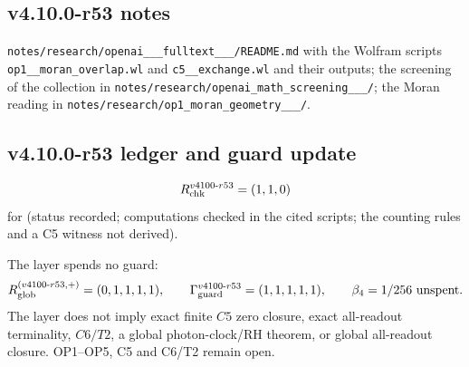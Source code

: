 \subsection*{v4.10.0-r53 notes}
\label{subsec:v4100-r53-notes}

\texttt{notes/\allowbreak research/\allowbreak openai\_\_\_\allowbreak fulltext\_\_\_/\allowbreak README.md} with the Wolfram scripts
\texttt{op1\_\_\allowbreak moran\_\allowbreak overlap.wl} and \texttt{c5\_\_\allowbreak exchange.wl} and their outputs; the screening of the collection in
\texttt{notes/\allowbreak research/\allowbreak openai\_\allowbreak math\_\allowbreak screening\_\_\_/}; the Moran reading in
\texttt{notes/\allowbreak research/\allowbreak op1\_\allowbreak moran\_\allowbreak geometry\_\_\_/}.

\subsection*{v4.10.0-r53 ledger and guard update}
\label{subsec:v4100-r53-ledger-guard}

\[
R_{\rm chk}^{v4100\text{-}r53}=(1,1,0)
\]
for (status recorded; computations checked in the cited scripts; the counting rules and a C5 witness not derived).

The layer spends no guard:
\[
R_{\rm glob}^{(v4100\text{-}r53,+)}=(0,1,1,1,1),
\qquad
\Gamma_{\rm guard}^{v4100\text{-}r53}=(1,1,1,1,1),
\qquad
\beta_4=1/256\ \text{unspent}.
\]
The layer does not imply exact finite \(C5\) zero closure, exact all-readout terminality, \(C6/T2\), a global photon-clock/RH theorem,
or global all-readout closure.  OP1--OP5, C5 and C6/T2 remain open.
